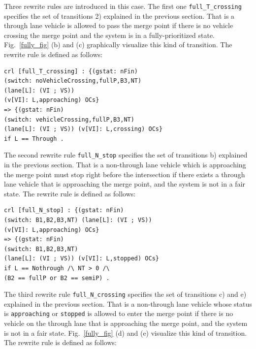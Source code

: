 \documentclass[10pt, conference, compsocconf]{IEEEtran}
\begin{document}

Three rewrite rules are introduced in this case.
The first one \verb!full_T_crossing! specifies the set of transitions 2) explained in the previous section.
That is a through lane vehicle is allowed to pass the merge point if there is no vehicle crossing the merge point and the system is in a fully-prioritized state.
Fig.~\ref{fully_fig} (b) and (c) graphically visualize this kind of transition.
The rewrite rule is defined as follows:

\begin{small}
\begin{verbatim}
crl [full_T_crossing] : {(gstat: nFin) 
(switch: noVehicleCrossing,fullP,B3,NT) 
(lane[L]: (VI ; VS)) 
(v[VI]: L,approaching) OCs} 
=> {(gstat: nFin) 
(switch: vehicleCrossing,fullP,B3,NT) 
(lane[L]: (VI ; VS)) (v[VI]: L,crossing) OCs} 
if L == Through .
\end{verbatim}
\end{small}


The second rewrite rule \verb!full_N_stop! specifies the set of transitions b) explained in the previous section.
That is a non-through lane vehicle which is approaching the merge point must stop right before the intersection if there exists a through lane vehicle that is approaching the merge point, and the system is not in a fair state. 
The rewrite rule is defined as follows:

\begin{small}
\begin{verbatim}
crl [full_N_stop] : {(gstat: nFin) 
(switch: B1,B2,B3,NT) (lane[L]: (VI ; VS)) 
(v[VI]: L,approaching) OCs}
=> {(gstat: nFin) 
(switch: B1,B2,B3,NT) 
(lane[L]: (VI ; VS)) (v[VI]: L,stopped) OCs}
if L == Nothrough /\ NT > 0 /\ 
(B2 == fullP or B2 == semiP) .
\end{verbatim}
\end{small}

The third rewrite rule \verb!full_N_crossing! specifies the set of transitions c) and e) explained in the previous section.
That is a non-through lane vehicle whose status is \verb!approaching! or \verb!stopped! is allowed to enter the merge point
if there is no vehicle on the through lane that is approaching the merge point, and the system is not in a fair state.
Fig.~\ref{fully_fig} (d) and (e) visualize this kind of transition.
The rewrite rule is defined as follows:
\end{document}

